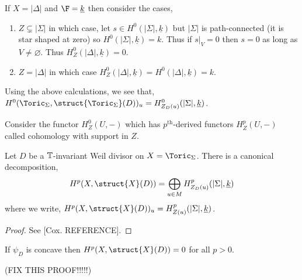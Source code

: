 \documentclass[12pt]{article}
\begin{document}
\begin{example}
If $X = |\Delta|$ and $\F = \underline{k}$ then consider the cases,
\begin{enumerate}
\item $Z \subsetneq |\Sigma|$ in which case, let $s \in H^0(|\Sigma|, \underline{k})$ but $|\Sigma|$ is path-connected (it is star shaped at zero) so $H^0(|\Sigma|, \underline{k}) = k$. Thus if $s|_V = 0$ then $s = 0$ as long as $V \neq \varnothing$. Thus $H_Z^0(|\Delta|, \underline{k}) = 0$.
\item $Z = |\Delta|$ in which case $H_Z^0(|\Delta|, \underline{k}) = H^0(|\Delta|, \underline{k}) = k$. 
\end{enumerate}
\end{example}

\begin{proposition}
Using the above calculations, we see that,
$H^0(\Toric_\Sigma, \struct{\Toric_\Sigma}(D))_u = H^0_{Z_D(u)}(|\Sigma|, \underline{k})$.
\end{proposition}

\begin{definition}
Consider the functor $H^0_Z(U, -)$ which has $p^{\text{th}}$-derived functors $H_Z^p(U, -)$ called cohomology with support in $Z$. 
\end{definition}

\begin{theorem}
Let $D$ be a $\mathbb{T}$-invariant Weil divisor on $X = \Toric_\Sigma$. There is a canonical decomposition,
\[ H^p(X, \struct{X}(D)) = \bigoplus_{u \in M} H^p_{Z_D(u)}(|\Sigma|, \underline{k}) \]
where we write, $H^p(X, \struct{X}(D))_u = H^p_{Z(u)}(|\Sigma|, \underline{k})$.
\end{theorem}

\begin{proof}
See [Cox. REFERENCE].
\end{proof}

\begin{corollary}
If $\psi_D$ is concave then $H^p(X, \struct{X}(D)) = 0$ for all $p > 0$. 
\end{corollary}

(FIX THIS PROOF!!!!!)
\end{document}
